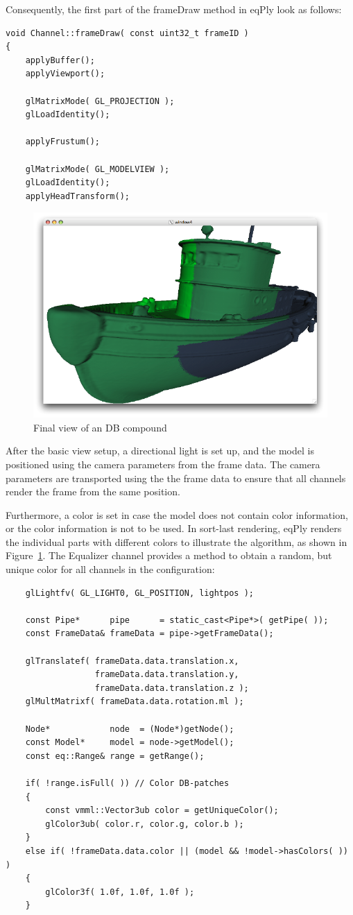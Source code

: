 \documentclass[10pt,a4]{scrartcl}
\newcommand{\fig}[1]{Figure~\ref{#1}}
\begin{document}
Consequently, the first part of the \textsf{frameDraw} method in
\textsf{eqPly} look as follows:

{\footnotesize\begin{lstlisting}
void Channel::frameDraw( const uint32_t frameID )
{
    applyBuffer();
    applyViewport();
            
    glMatrixMode( GL_PROJECTION );
    glLoadIdentity();

    applyFrustum();

    glMatrixMode( GL_MODELVIEW );
    glLoadIdentity();
    applyHeadTransform();
\end{lstlisting}}

\begin{figure}
  \includegraphics[width=.4\textwidth]{images/DB.pdf}
  {\caption{\small\label{fDB}Final view of an DB compound}}
\end{figure}

After the basic view setup, a directional light is set up, and the model
is positioned using the camera parameters from the frame data. The
camera parameters are transported using the the frame data to ensure
that all channels render the frame from the same position. 

Furthermore, a color is set in case the model does not contain color
information, or the color information is not to be used. In sort-last
rendering, \textsf{eqPly} renders the individual parts with different
colors to illustrate the algorithm, as shown in \fig{fDB}. The Equalizer
channel provides a method to obtain a random, but unique color for all
channels in the configuration:

{\footnotesize\begin{lstlisting}
    glLightfv( GL_LIGHT0, GL_POSITION, lightpos );

    const Pipe*      pipe      = static_cast<Pipe*>( getPipe( ));
    const FrameData& frameData = pipe->getFrameData();

    glTranslatef( frameData.data.translation.x,
                  frameData.data.translation.y,
                  frameData.data.translation.z );
    glMultMatrixf( frameData.data.rotation.ml );

    Node*            node  = (Node*)getNode();
    const Model*     model = node->getModel();
    const eq::Range& range = getRange();

    if( !range.isFull( )) // Color DB-patches
    {
        const vmml::Vector3ub color = getUniqueColor();
        glColor3ub( color.r, color.g, color.b );
    }
    else if( !frameData.data.color || (model && !model->hasColors( )) )
    {
        glColor3f( 1.0f, 1.0f, 1.0f );
    }
    
\end{lstlisting}}
\end{document}
